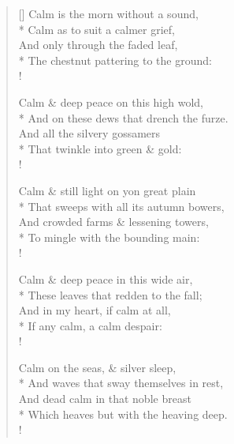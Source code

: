 \documentclass[MAIN]{subfiles}
\begin{document}
\settowidth{\versewidth}{The chestnut pattering to the ground:}
\begin{verse}[\versewidth]
Calm is the morn without a sound,\\*
\vin Calm as to suit a calmer grief,\\
\vin And only through the faded leaf,\\*
The chestnut pattering to the ground:\\!

Calm \& deep peace on this high wold,\\*
\vin And on these dews that drench the furze.\\
\vin And all the silvery gossamers\\*
That twinkle into green \& gold:\\!

Calm \& still light on yon great plain\\*
\vin That sweeps with all its autumn bowers,\\
\vin And crowded farms \& lessening towers,\\*
To mingle with the bounding main:\\!

Calm \& deep peace in this wide air,\\*
\vin These leaves that redden to the fall;\\
\vin And in my heart, if calm at all,\\*
If any calm, a calm despair:\\!

Calm on the seas, \& silver sleep,\\*
\vin And waves that sway themselves in rest,\\
\vin And dead calm in that noble breast\\*
Which heaves but with the heaving deep.\\!
\end{verse}
\end{document}
